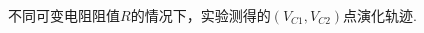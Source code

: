 \documentclass[a4paper, 10pt]{article}
\begin{document}
\begin{multicols*}{2}
\begin{figure}[H]
{    }
    \caption{不同可变电阻阻值$R$的情况下，实验测得的$(V_{C1},V_{C2})$点演化轨迹.}
    \label{LissajousFigure}
\end{figure}



\end{multicols*}

\clearpage
\end{document}
